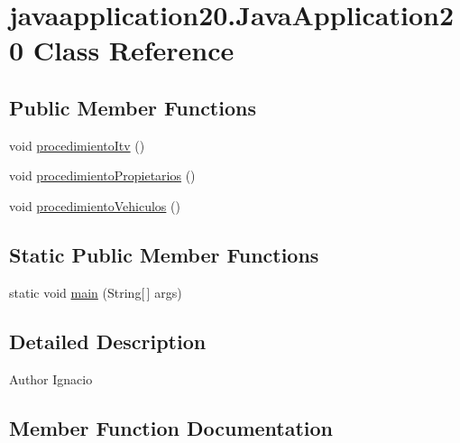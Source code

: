 \hypertarget{classjavaapplication20_1_1_java_application20}{}\section{javaapplication20.\+Java\+Application20 Class Reference}
\label{classjavaapplication20_1_1_java_application20}
\subsection*{Public Member Functions}
\begin{DoxyCompactItemize}
\item 
void \mbox{\hyperlink{classjavaapplication20_1_1_java_application20_af8de1708de71156b3c2bb28b2e3732eb}{procedimiento\+Itv}} ()
\item 
void \mbox{\hyperlink{classjavaapplication20_1_1_java_application20_a1dd2d7b69c9e7a7adaffce66b9653943}{procedimiento\+Propietarios}} ()
\item 
void \mbox{\hyperlink{classjavaapplication20_1_1_java_application20_af1bd8f612fa222da9ade17b155b54cc4}{procedimiento\+Vehiculos}} ()
\end{DoxyCompactItemize}
\subsection*{Static Public Member Functions}
\begin{DoxyCompactItemize}
\item 
static void \mbox{\hyperlink{classjavaapplication20_1_1_java_application20_af6e62b4cd624245e4c44b01a59fee969}{main}} (String\mbox{[}$\,$\mbox{]} args)
\end{DoxyCompactItemize}


\subsection{Detailed Description}
\begin{DoxyAuthor}{Author}
Ignacio 
\end{DoxyAuthor}


\subsection{Member Function Documentation}
\mbox{\label{classjavaapplication20_1_1_java_application20_af6e62b4cd624245e4c44b01a59fee969}} 
